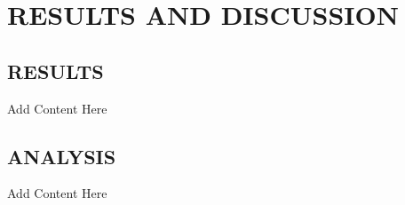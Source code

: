 \chapter{\texorpdfstring{\centering \textbf{\MakeUppercase{Results and Discussion}}}{Results and Discussion}}

\section{\textbf{\MakeUppercase{Results}}}
Add Content Here\\

\section{\textbf{\MakeUppercase{Analysis}}}
Add Content Here\\


